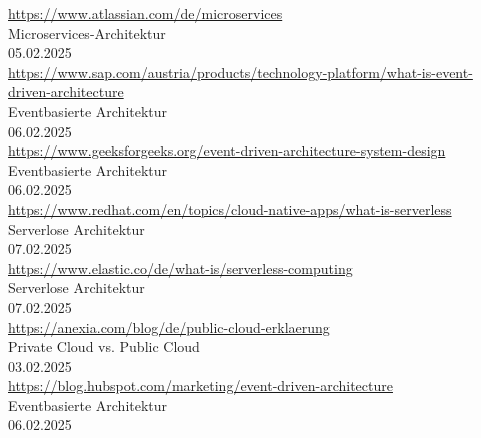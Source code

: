 \begin{thebibliography}{999}
     \href{https://www.atlassian.com/de/microservices}{https://www.atlassian.com/de/microservices} \\
     Microservices-Architektur \\
     05.02.2025 \\

     \href{https://www.sap.com/austria/products/technology-platform/what-is-event-driven-architecture}{https://www.sap.com/austria/products/technology-platform/what-is-event-driven-architecture} \\
     Eventbasierte Architektur \\
     06.02.2025 \\

     \href{https://www.geeksforgeeks.org/event-driven-architecture-system-design}{https://www.geeksforgeeks.org/event-driven-architecture-system-design} \\
     Eventbasierte Architektur \\
     06.02.2025 \\

     \href{https://www.redhat.com/en/topics/cloud-native-apps/what-is-serverless}{https://www.redhat.com/en/topics/cloud-native-apps/what-is-serverless} \\
     Serverlose Architektur \\
     07.02.2025 \\

     \href{https://www.elastic.co/de/what-is/serverless-computing}{https://www.elastic.co/de/what-is/serverless-computing} \\
     Serverlose Architektur \\
     07.02.2025 \\

     \href{https://anexia.com/blog/de/public-cloud-erklaerung}{https://anexia.com/blog/de/public-cloud-erklaerung} \\
     Private Cloud vs. Public Cloud \\
     03.02.2025 \\

     \href{https://blog.hubspot.com/marketing/event-driven-architecture}{https://blog.hubspot.com/marketing/event-driven-architecture} \\
     Eventbasierte Architektur \\
     06.02.2025 \\
    
\end{thebibliography}